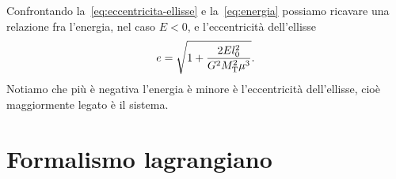 Confrontando la~\eqref{eq:eccentricita-ellisse} e la~\eqref{eq:energia} possiamo
ricavare una relazione fra l'energia, nel caso $E<0$, e l'eccentricità
dell'ellisse
\begin{equation}
  e = \sqrt{1+\frac{2El_0^2}{G^2M_\textup{T}^2\mu^3}}.
\end{equation}
Notiamo che più è negativa l'energia è minore è l'eccentricità dell'ellisse,
cioè maggiormente legato è il sistema. %

\section{Formalismo lagrangiano}
\label{sec:formalismo-lagrange}



